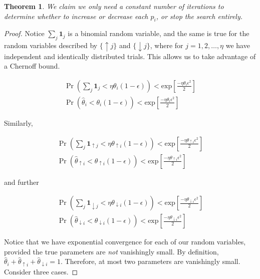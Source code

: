 \documentclass{article}
\newtheorem{theorem}{Theorem}
\begin{document}
\begin{theorem}
We claim we only need a constant number of iterations to determine whether to increase or decrease each $p_i$, or stop the search entirely.
\end{theorem}

\begin{proof}

Notice $\sum_j \boldsymbol{1}_j$ is a binomial random variable, and the same is true for the random variables described by $\{\uparrow j\}$ and $\{\downarrow j\}$, where for $j = 1, 2, \ldots, \eta$ we have independent and identically distributed trials. This allows us to take advantage of a Chernoff bound.

\begin{align*}
\Pr \left(\sum_j \boldsymbol{1}_j < \eta \theta_i (1-\epsilon)\right) < \text{exp}\left[\frac{-\eta \theta_i  \epsilon^2}{2}\right] \\
\Pr \left (\hat{\theta}_i < \theta_i (1-\epsilon) \right) < \text{exp}\left[\frac{- \eta \theta_i \epsilon^2}{2}\right]
\end{align*}

Similarly,

\begin{align*}
\Pr \left(\sum_j \boldsymbol{1}_{\uparrow j} < \eta \theta_{\uparrow i} (1-\epsilon)\right) < \text{exp}\left[\frac{-\eta \theta_{\uparrow i}  \epsilon^2}{2}\right] \\
\Pr \left (\hat{\theta}_{\uparrow i} < \theta_{\uparrow i} (1-\epsilon) \right) < \text{exp}\left[\frac{- \eta \theta_{\uparrow i} \epsilon^2}{2}\right]
\end{align*}

and further

\begin{align*}
\Pr \left(\sum_j \boldsymbol{1}_{\downarrow j} < \eta \theta_{\downarrow i} (1-\epsilon)\right) < \text{exp}\left[\frac{-\eta \theta_{\downarrow i}  \epsilon^2}{2}\right] \\
\Pr \left (\hat{\theta}_{\downarrow i} < \theta_{\downarrow i} (1-\epsilon) \right) < \text{exp}\left[\frac{- \eta \theta_{\downarrow i} \epsilon^2}{2}\right]
\end{align*}

Notice that we have exponential convergence for each of our random variables, provided the true parameters are \emph{not} vanishingly small. By definition, $\hat{\theta}_i + \hat{\theta}_{\uparrow i} + \hat{\theta}_{\downarrow i} = 1$. Therefore, at most two parameters are vanishingly small. Consider three cases.


\end{proof}
\end{document}
